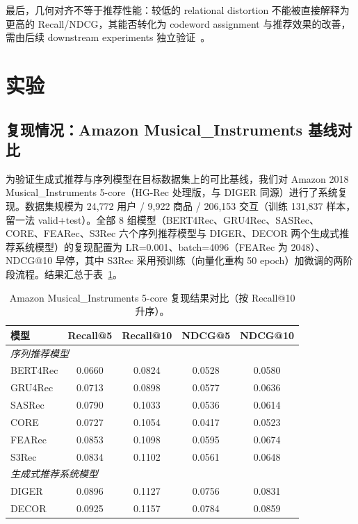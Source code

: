 \documentclass[sigconf, nonacm, anonymize, 9pt]{acmart}
\begin{document}
最后，几何对齐不等于推荐性能：较低的 relational distortion 不能被直接解释为更高的 Recall/NDCG，其能否转化为 codeword assignment 与推荐效果的改善，需由后续 downstream experiments 独立验证~\cite{jin2024cost,topotok2026}。

\section{实验}

\subsection{复现情况：Amazon Musical\_Instruments 基线对比}

为验证生成式推荐与序列模型在目标数据集上的可比基线，我们对 Amazon 2018 Musical\_Instruments 5-core（HG-Rec 处理版，与 DIGER 同源）进行了系统复现。数据集规模为 24,772 用户 / 9,922 商品 / 206,153 交互（训练 131,837 样本，留一法 valid+test）。全部 8 组模型（BERT4Rec、GRU4Rec、SASRec、CORE、FEARec、S3Rec 六个序列推荐模型与 DIGER、DECOR 两个生成式推荐系统模型）的复现配置为 LR=0.001、batch=4096（FEARec 为 2048）、NDCG@10 早停，其中 S3Rec 采用预训练（向量化重构 50 epoch）加微调的两阶段流程。结果汇总于表~\ref{tab:repro-overall}。

\begin{table}[ht]
\centering
\small
\caption{Amazon Musical\_Instruments 5-core 复现结果对比（按 Recall@10 升序）。}
\label{tab:repro-overall}
\begin{tabular}{lcccc}
\toprule
模型 & Recall@5 & Recall@10 & NDCG@5 & NDCG@10 \\
\midrule
\multicolumn{5}{l}{\textit{序列推荐模型}} \\
BERT4Rec     & 0.0660 & 0.0824 & 0.0528 & 0.0580 \\
GRU4Rec      & 0.0713 & 0.0898 & 0.0577 & 0.0636 \\
SASRec       & 0.0790 & 0.1033 & 0.0536 & 0.0614 \\
CORE         & 0.0727 & 0.1054 & 0.0417 & 0.0523 \\
FEARec       & 0.0853 & 0.1098 & 0.0595 & 0.0674 \\
S3Rec        & 0.0834 & 0.1102 & 0.0561 & 0.0648 \\
\midrule
\multicolumn{5}{l}{\textit{生成式推荐系统模型}} \\
DIGER        & 0.0896 & 0.1127 & 0.0756 & 0.0831 \\
DECOR        & 0.0925 & 0.1157 & 0.0784 & 0.0859 \\
\bottomrule
\end{tabular}
\end{table}
\end{document}
